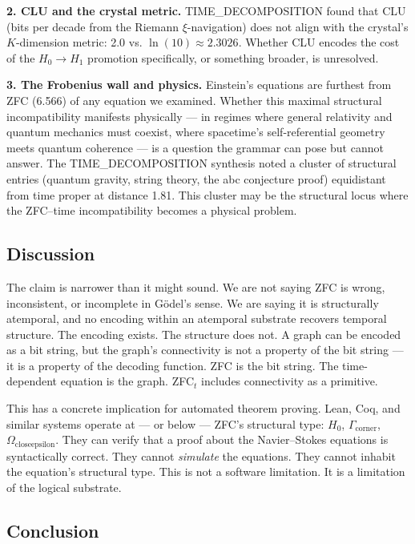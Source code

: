 \documentclass[12pt,a4paper]{article}
\begin{document}
\textbf{2. CLU and the crystal metric.} TIME\_DECOMPOSITION found that CLU (bits per decade from the Riemann $\xi$-navigation) does not align with the crystal's $K$-dimension metric: 2.0 vs. $\ln(10) \approx 2.3026$. Whether CLU encodes the cost of the $H_0 \to H_1$ promotion specifically, or something broader, is unresolved.

\textbf{3. The Frobenius wall and physics.} Einstein's equations are furthest from ZFC (6.566) of any equation we examined. Whether this maximal structural incompatibility manifests physically --- in regimes where general relativity and quantum mechanics must coexist, where spacetime's self-referential geometry meets quantum coherence --- is a question the grammar can pose but cannot answer. The TIME\_DECOMPOSITION synthesis noted a cluster of structural entries (quantum gravity, string theory, the abc conjecture proof) equidistant from time proper at distance 1.81. This cluster may be the structural locus where the ZFC--time incompatibility becomes a physical problem.

\subsection{Discussion}

The claim is narrower than it might sound. We are not saying ZFC is wrong, inconsistent, or incomplete in Gödel's sense. We are saying it is structurally atemporal, and no encoding within an atemporal substrate recovers temporal structure. The encoding exists. The structure does not. A graph can be encoded as a bit string, but the graph's connectivity is not a property of the bit string --- it is a property of the decoding function. ZFC is the bit string. The time-dependent equation is the graph. ZFC$_t$ includes connectivity as a primitive.

This has a concrete implication for automated theorem proving. Lean, Coq, and similar systems operate at --- or below --- ZFC's structural type: $H_0$, $\Gamma_{\text{corner}}$, $\Omega_{\text{closeepsilon}}$. They can verify that a proof about the Navier--Stokes equations is syntactically correct. They cannot \emph{simulate} the equations. They cannot inhabit the equation's structural type. This is not a software limitation. It is a limitation of the logical substrate.

\subsection{Conclusion}
\end{document}
